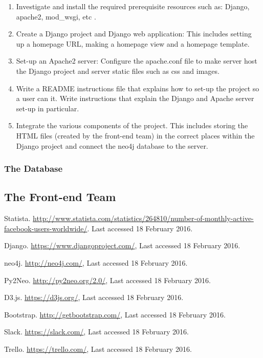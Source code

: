 \documentclass[10pt,onecolumn]{article}
\begin{document}
\begin{enumerate}
	\item Investigate and install the required prerequisite resources such as: Django, apache2, mod\_wsgi, etc \cite{django}.
	\item Create a Django project and Django web application: This includes setting up a homepage URL, making a homepage view and a homepage template.
	\item Set-up an Apache2 server: Configure the apache.conf file to make server host the Django project and server static files such as css and images.
	\item Write a README instructions file that explains how to set-up the project so a user can it. Write instructions that explain the Django and Apache server set-up in particular.
	\item Integrate the various components of the project. This includes storing the HTML files (created by the front-end team) in the correct places within the Django project and connect the neo4j database to the server.     
\end{enumerate}

\subsubsection{The Database}



\subsection{The Front-end Team}



\begin{thebibliography}{1}
 Statista. \url {http://www.statista.com/statistics/264810/number-of-monthly-active-facebook-users-worldwide/}. Last accessed 18 February 2016. 

  Django. \url{https://www.djangoproject.com/}, Last accessed 18 February 2016.

 neo4j. \url{http://neo4j.com/}, Last accessed 18 February 2016.

 Py2Neo. \url{http://py2neo.org/2.0/}, Last accessed 18 February 2016.

 D3.js. \url{https://d3js.org/}, Last accessed 18 February 2016.


 Bootstrap. \url{http://getbootstrap.com/}, Last accessed 18 February 2016.

 Slack. \url{https://slack.com/}, Last accessed 18 February 2016.

 Trello. \url{https://trello.com/}, Last accessed 18 February 2016.
	
\end{thebibliography}

\clearpage
\end{document}
